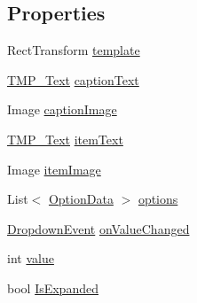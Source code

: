 \subsection*{Properties}
\begin{DoxyCompactItemize}
\item 
Rect\+Transform \mbox{\hyperlink{class_t_m_pro_1_1_t_m_p___dropdown_a6ab2bc63f80032f0d78d195fac730d5f}{template}}
\item 
\mbox{\hyperlink{class_t_m_pro_1_1_t_m_p___text}{T\+M\+P\+\_\+\+Text}} \mbox{\hyperlink{class_t_m_pro_1_1_t_m_p___dropdown_a525bc41ab8c46321882490782ad76177}{caption\+Text}}
\item 
Image \mbox{\hyperlink{class_t_m_pro_1_1_t_m_p___dropdown_a5cf589817b242dfa0a8a3c01e47afcd0}{caption\+Image}}
\item 
\mbox{\hyperlink{class_t_m_pro_1_1_t_m_p___text}{T\+M\+P\+\_\+\+Text}} \mbox{\hyperlink{class_t_m_pro_1_1_t_m_p___dropdown_a1d3fd4382b24500164cf0f90038fed61}{item\+Text}}
\item 
Image \mbox{\hyperlink{class_t_m_pro_1_1_t_m_p___dropdown_a86b50c242998eef867e10237940509ea}{item\+Image}}
\item 
List$<$ \mbox{\hyperlink{class_t_m_pro_1_1_t_m_p___dropdown_1_1_option_data}{Option\+Data}} $>$ \mbox{\hyperlink{class_t_m_pro_1_1_t_m_p___dropdown_a43e1c79bd6e32dd4546a6987d684bbb6}{options}}
\item 
\mbox{\hyperlink{class_t_m_pro_1_1_t_m_p___dropdown_1_1_dropdown_event}{Dropdown\+Event}} \mbox{\hyperlink{class_t_m_pro_1_1_t_m_p___dropdown_aadf2cfdd8d965fdca8e147ef8991def4}{on\+Value\+Changed}}
\item 
int \mbox{\hyperlink{class_t_m_pro_1_1_t_m_p___dropdown_a0e886902a8de21487e23342580d68728}{value}}
\item 
bool \mbox{\hyperlink{class_t_m_pro_1_1_t_m_p___dropdown_a8006beec9a6f881bda679cff7f87eddd}{Is\+Expanded}}
\end{DoxyCompactItemize}


